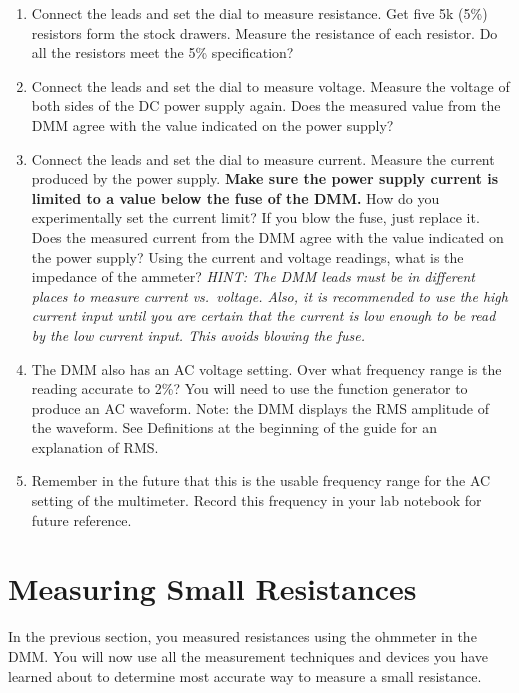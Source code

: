 \documentclass[
]{article}
\begin{document}
\begin{enumerate}
\def\labelenumi{\arabic{enumi}.}
\item
  Connect the leads and set the dial to measure resistance. Get five 5k
  (5\%) resistors form the stock drawers. Measure the resistance of each
  resistor. Do all the resistors meet the 5\% specification?
\item
  Connect the leads and set the dial to measure voltage. Measure the
  voltage of both sides of the DC power supply again. Does the measured
  value from the DMM agree with the value indicated on the power supply?
\item
  Connect the leads and set the dial to measure current. Measure the
  current produced by the power supply. \textbf{Make sure the power
  supply current is limited to a value below the fuse of the DMM.} How
  do you experimentally set the current limit? If you blow the fuse,
  just replace it. Does the measured current from the DMM agree with the
  value indicated on the power supply? Using the current and voltage
  readings, what is the impedance of the ammeter? \emph{HINT: The DMM
  leads must be in different places to measure current vs.~voltage.
  Also, it is recommended to use the high current input until you are
  certain that the current is low enough to be read by the low current
  input. This avoids blowing the fuse.}
\item
  The DMM also has an AC voltage setting. Over what frequency range is
  the reading accurate to 2\%? You will need to use the function
  generator to produce an AC waveform. Note: the DMM displays the RMS
  amplitude of the waveform. See Definitions at the beginning of the
  guide for an explanation of RMS.
\item
  Remember in the future that this is the usable frequency range for the
  AC setting of the multimeter. Record this frequency in your lab
  notebook for future reference.
\end{enumerate}

\hypertarget{measuring-small-resistances}{%
\section{Measuring Small
Resistances}\label{measuring-small-resistances}}

In the previous section, you measured resistances using the ohmmeter in
the DMM. You will now use all the measurement techniques and devices you
have learned about to determine most accurate way to measure a small
resistance.
\end{document}
